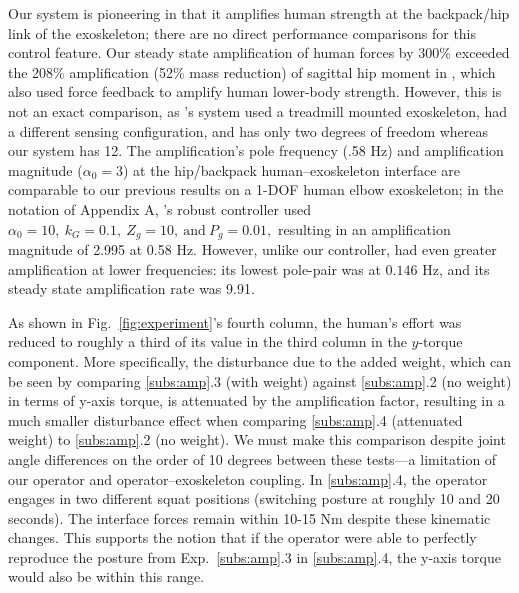 \documentclass[utf8]{frontiersSCNS}
\renewcommand*{\cite}[1]{\citep{#1}}
\begin{document}
Our system is pioneering in that it amplifies human strength at the backpack/hip link of the exoskeleton; there are no direct performance comparisons for this control feature.
Our steady state amplification of human forces by 300\% exceeded the 208\% amplification (52\% mass reduction) of sagittal hip moment in \cite{ZanottoAkiyamaStegallAgrawal2015TRO}, which also used force feedback to amplify human lower-body strength.
However, this is not an exact comparison, as \cite{ZanottoAkiyamaStegallAgrawal2015TRO}'s system used a treadmill mounted exoskeleton, had a different sensing configuration, and has only two degrees of freedom whereas our system has 12.
The amplification's pole frequency (.58 Hz) and amplification magnitude ($\alpha_0=3$) at the hip/backpack human--exoskeleton interface are comparable to our previous results on a 1-DOF human elbow exoskeleton; in the notation of Appendix A, \cite{HeThomasPaineSentis2019ACC}'s robust controller used $\alpha_0=10,\ k_G=0.1,\ Z_g=10,\ \text{and}\ P_g=0.01,$ resulting in an amplification magnitude of 2.995 at 0.58 Hz.
However, unlike our controller, \cite{HeThomasPaineSentis2019ACC} had even greater amplification at lower frequencies: its lowest pole-pair was at $0.146$ Hz, and its steady state amplification rate was 9.91.


As shown in Fig.~\ref{fig:experiment}'s fourth column, the human's effort was reduced to roughly a third of its value in the third column in the $y$-torque component.
More specifically, the disturbance due to the added weight, which can be seen by comparing \ref{subs:amp}.3 (with weight) against \ref{subs:amp}.2 (no weight) in terms of y-axis torque, is attenuated by the amplification factor, resulting in a much smaller disturbance effect when comparing \ref{subs:amp}.4 (attenuated weight) to \ref{subs:amp}.2 (no weight). We must make this comparison despite joint angle differences on the order of 10 degrees between these tests---a limitation of our operator and operator--exoskeleton coupling. In \ref{subs:amp}.4, the operator engages in two different squat positions (switching posture at roughly 10 and 20 seconds). The interface forces remain within 10-15 Nm despite these kinematic changes. This supports the notion that if the operator were able to perfectly reproduce the posture from Exp.~\ref{subs:amp}.3 in \ref{subs:amp}.4, the y-axis torque would also be within this range.
\end{document}

